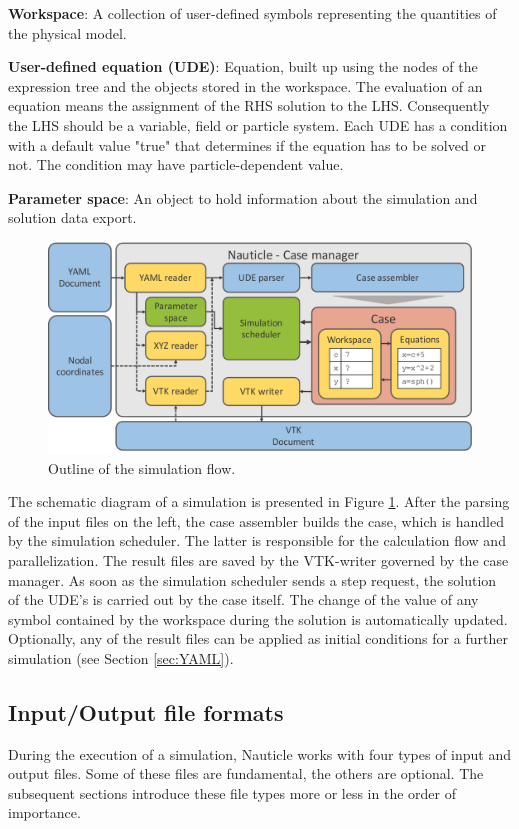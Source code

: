 \documentclass[a4paper,12pt,openany]{book}
\theoremstyle{break}
\begin{document}
\textbf{Workspace}: A collection of user-defined symbols representing the quantities of the physical model.

\textbf{User-defined equation (UDE)}: Equation, built up using the nodes of the expression tree and the objects stored in the workspace. The evaluation of an equation means the assignment of the RHS solution to the LHS. Consequently the LHS should be a variable, field or particle system. Each UDE has a condition with a default value "true" that determines if the equation has to be solved or not. The condition may have particle-dependent value.

\textbf{Parameter space}: An object to hold information about the simulation and solution data export.

\begin{figure}[H]
  \includegraphics[scale=0.55]{workflow.pdf}
  \centering
  \caption{Outline of the simulation flow.}
  \label{fig:workflow}
\end{figure}

The schematic diagram of a simulation is presented in Figure \ref{fig:workflow}. After the parsing of the input files on the left, the case assembler builds the case, which is handled by the simulation scheduler. The latter is responsible for the calculation flow and parallelization. The result files are saved by the VTK-writer governed by the case manager. 
As soon as the simulation scheduler sends a step request, the solution of the UDE's is carried out by the case itself. The change of the value of any symbol contained by the workspace during the solution is automatically updated. Optionally, any of the result files can be applied as initial conditions for a further simulation (see Section \ref{sec:YAML}).

\subsection{Input/Output file formats}
During the execution of a simulation, Nauticle works with four types of input and output files. Some of these files are fundamental, the others are optional. The subsequent sections introduce these file types more or less in the order of importance.
\end{document}

